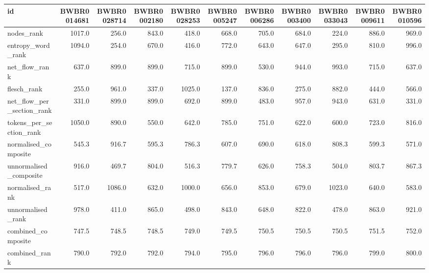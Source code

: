 \begin{tabular}{lrrrrrrrrrr}
\toprule
id & BWBR0014681 & BWBR0028714 & BWBR0002180 & BWBR0028253 & BWBR0005247 & BWBR0006286 & BWBR0003400 & BWBR0033043 & BWBR0009611 & BWBR0010596 \\
\midrule
nodes\_rank & 1017.0 & 256.0 & 843.0 & 418.0 & 668.0 & 705.0 & 684.0 & 224.0 & 886.0 & 969.0 \\
\cline{1-11}
entropy\_word\_rank & 1094.0 & 254.0 & 670.0 & 416.0 & 772.0 & 643.0 & 647.0 & 295.0 & 810.0 & 996.0 \\
\cline{1-11}
net\_flow\_rank & 637.0 & 899.0 & 899.0 & 715.0 & 899.0 & 530.0 & 944.0 & 993.0 & 715.0 & 637.0 \\
\cline{1-11}
flesch\_rank & 255.0 & 961.0 & 337.0 & 1025.0 & 137.0 & 836.0 & 275.0 & 882.0 & 444.0 & 566.0 \\
\cline{1-11}
net\_flow\_per\_section\_rank & 331.0 & 899.0 & 899.0 & 692.0 & 899.0 & 483.0 & 957.0 & 943.0 & 631.0 & 331.0 \\
\cline{1-11}
tokens\_per\_section\_rank & 1050.0 & 890.0 & 550.0 & 642.0 & 785.0 & 751.0 & 622.0 & 600.0 & 723.0 & 816.0 \\
\cline{1-11}
normalised\_composite & 545.3 & 916.7 & 595.3 & 786.3 & 607.0 & 690.0 & 618.0 & 808.3 & 599.3 & 571.0 \\
\cline{1-11}
unnormalised\_composite & 916.0 & 469.7 & 804.0 & 516.3 & 779.7 & 626.0 & 758.3 & 504.0 & 803.7 & 867.3 \\
\cline{1-11}
normalised\_rank & 517.0 & 1086.0 & 632.0 & 1000.0 & 656.0 & 853.0 & 679.0 & 1023.0 & 640.0 & 583.0 \\
\cline{1-11}
unnormalised\_rank & 978.0 & 411.0 & 865.0 & 498.0 & 843.0 & 648.0 & 822.0 & 478.0 & 863.0 & 921.0 \\
\cline{1-11}
combined\_composite & 747.5 & 748.5 & 748.5 & 749.0 & 749.5 & 750.5 & 750.5 & 750.5 & 751.5 & 752.0 \\
\cline{1-11}
combined\_rank & 790.0 & 792.0 & 792.0 & 794.0 & 795.0 & 796.0 & 796.0 & 796.0 & 799.0 & 800.0 \\
\cline{1-11}
\bottomrule
\end{tabular}
